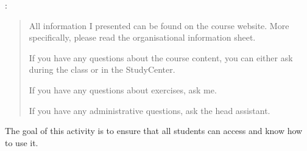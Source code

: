 \quest


:
\begin{quote}
    All information I presented can be found on the course website. More
    specifically, please read the organisational information sheet.

    If you have any questions about the course content, you can either
    ask during the class or in the StudyCenter.

    If you have any questions about exercises, ask me.

    If you have any administrative questions, ask the head assistant.
\end{quote}

\quest


\begin{Explanation}
    The goal of this activity is to ensure that all students can access
    \Expert{} and know how to use it.
\end{Explanation}


\begin{Preparation}
\end{Preparation}

